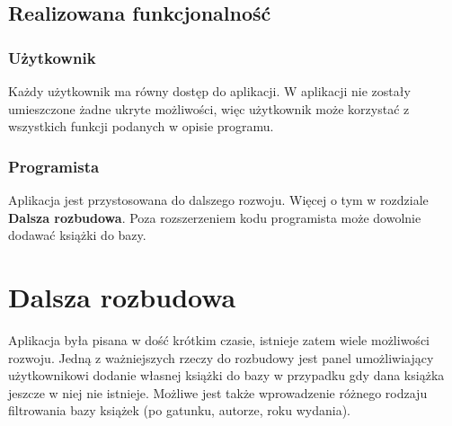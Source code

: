 \documentclass[a4paper,10pt]{article}
\begin{document}
\begin{enumerate}
\subsection{Realizowana funkcjonalność}
\subsubsection{Użytkownik}
Każdy użytkownik ma równy dostęp do aplikacji. W aplikacji nie zostały umieszczone żadne ukryte możliwości, więc użytkownik może korzystać z wszystkich funkcji podanych w opisie programu.
\subsubsection{Programista}
Aplikacja jest przystosowana do dalszego rozwoju. Więcej o tym w rozdziale \textbf{Dalsza rozbudowa}. Poza rozszerzeniem kodu programista może dowolnie dodawać książki do bazy.
\section{Dalsza rozbudowa}
Aplikacja była pisana w dość krótkim czasie, istnieje zatem wiele możliwości rozwoju. Jedną z ważniejszych rzeczy do rozbudowy jest panel umożliwiający użytkownikowi dodanie własnej książki do bazy w przypadku gdy dana książka jeszcze w niej nie istnieje. Możliwe jest także wprowadzenie różnego rodzaju filtrowania bazy książek (po gatunku, autorze, roku wydania).

\end{enumerate}
\end{document}

